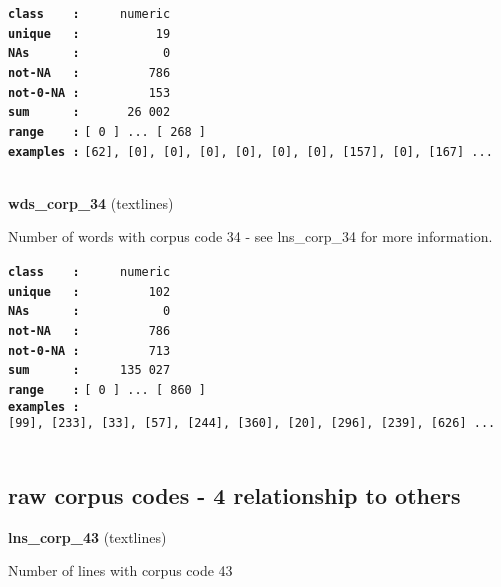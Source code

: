 \documentclass[]{article}
\begin{document}
\textbf{\texttt{class\ \ \ \ :}} \texttt{~~~~~numeric}\\
\textbf{\texttt{unique\ \ \ :}} \texttt{~~~~~~~~~~19}\\
\textbf{\texttt{NAs\ \ \ \ \ \ :}} \texttt{~~~~~~~~~~~0}\\
\textbf{\texttt{not-NA\ \ \ :}} \texttt{~~~~~~~~~786}\\
\textbf{\texttt{not-0-NA\ :}} \texttt{~~~~~~~~~153}\\
\textbf{\texttt{sum\ \ \ \ \ \ :}} \texttt{~~~~~~26~002}\\
\textbf{\texttt{range\ \ \ \ :}}
\texttt{{[}\ 0\ {]}\ ...\ {[}\ 268\ {]}}\\
\textbf{\texttt{examples\ :}}
\texttt{{[}62{]},\ {[}0{]},\ {[}0{]},\ {[}0{]},\ {[}0{]},\ {[}0{]},\ {[}0{]},\ {[}157{]},\ {[}0{]},\ {[}167{]}\ ...}\\

~

\textbf{wds\_corp\_34} (textlines)

Number of words with corpus code 34 - see lns\_corp\_34 for more
information.

\textbf{\texttt{class\ \ \ \ :}} \texttt{~~~~~numeric}\\
\textbf{\texttt{unique\ \ \ :}} \texttt{~~~~~~~~~102}\\
\textbf{\texttt{NAs\ \ \ \ \ \ :}} \texttt{~~~~~~~~~~~0}\\
\textbf{\texttt{not-NA\ \ \ :}} \texttt{~~~~~~~~~786}\\
\textbf{\texttt{not-0-NA\ :}} \texttt{~~~~~~~~~713}\\
\textbf{\texttt{sum\ \ \ \ \ \ :}} \texttt{~~~~~135~027}\\
\textbf{\texttt{range\ \ \ \ :}}
\texttt{{[}\ 0\ {]}\ ...\ {[}\ 860\ {]}}\\
\textbf{\texttt{examples\ :}}
\texttt{{[}99{]},\ {[}233{]},\ {[}33{]},\ {[}57{]},\ {[}244{]},\ {[}360{]},\ {[}20{]},\ {[}296{]},\ {[}239{]},\ {[}626{]}\ ...}\\

~

\subsection{raw corpus codes - 4 relationship to
others}\label{raw-corpus-codes---4-relationship-to-others}

\textbf{lns\_corp\_43} (textlines)

Number of lines with corpus code 43
\end{document}
